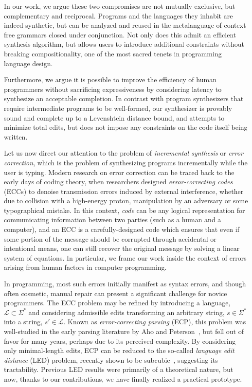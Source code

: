 \documentclass[sigplan,review,anonymous,acmsmall]{acmart}\settopmatter{printfolios=false,printccs=false,printacmref=false}
\begin{document}
In our work, we argue these two compromises are not mutually exclusive, but complementary and reciprocal. Programs and the languages they inhabit are indeed synthetic, but can be analyzed and reused in the metalanguage of context-free grammars closed under conjunction. Not only does this admit an efficient synthesis algorithm, but allows users to introduce additional constraints without breaking compositionality, one of the most sacred tenets in programming language design.

Furthermore, we argue it is possible to improve the efficiency of human programmers without sacrificing expressiveness by considering latency to synthesize an acceptable completion. In contrast with program synthesizers that require intermediate programs to be well-formed, our synthesizer is provably sound and complete up to a Levenshtein distance bound, and attempts to minimize total edits, but does not impose any constraints on the code itself being written.

Let us now direct our attention to the problem of \textit{incremental synthesis} or \textit{error correction}, which is the problem of synthesizing programs incrementally while the user is typing. Modern research on error correction can be traced back to the early days of coding theory, when researchers designed \textit{error-correcting codes} (ECCs) to denoise transmission errors induced by external interference, whether due to collision with a high-energy proton, manipulation by an adversary or some typographical mistake. In this context, \textit{code} can be any logical representation for communicating information between two parties (such as a human and a computer), and an ECC is a carefully-designed code which ensures that even if some portion of the message should be corrupted through accidental or intentional means, one can still recover the original message by solving a linear system of equations. In particular, we frame our work inside the context of errors arising from human factors in computer programming.

In programming, most such errors initially manifest as syntax errors, and though often cosmetic, manual repair can present a significant challenge for novice programmers. The ECC problem may be refined by introducing a language, $\mathcal{L} \subset \Sigma^*$ and considering admissible edits transforming an arbitrary string, $s \in \Sigma^*$ into a string, $s'\in\mathcal{L}$. Known as \textit{error-correcting parsing} (ECP), this problem was well-studied in the early parsing literature by Aho and Peterson~\cite{aho1972minimum}, but fell out of favor for many years, perhaps due to its perceived complexity. By considering only minimal-length edits, ECP can be reduced to the so-called \textit{language edit distance} (LED) problem, recently shown to be subcubic~\cite{bringmann2019truly}, suggesting its tractability. Previous LED results were primarily of a theoretical nature, but now, thanks to our contributions, we have finally realized a practical prototype.
\end{document}
